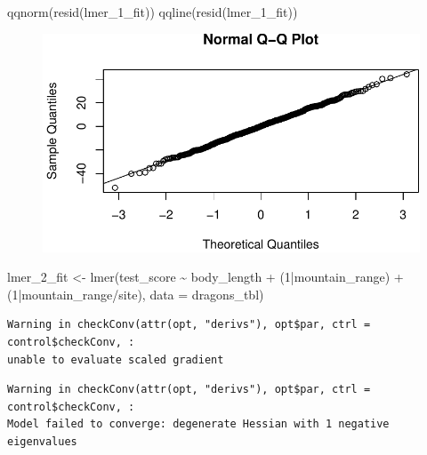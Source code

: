 \documentclass[
  letterpaper,
]{scrbook}
\newenvironment{Shaded}{\begin{snugshade}}{\end{snugshade}}
\newcommand{\AttributeTok}[1]{\textcolor[rgb]{0.40,0.45,0.13}{#1}}
\newcommand{\DecValTok}[1]{\textcolor[rgb]{0.68,0.00,0.00}{#1}}
\newcommand{\FunctionTok}[1]{\textcolor[rgb]{0.28,0.35,0.67}{#1}}
\newcommand{\NormalTok}[1]{\textcolor[rgb]{0.00,0.23,0.31}{#1}}
\newcommand{\OtherTok}[1]{\textcolor[rgb]{0.00,0.23,0.31}{#1}}
\newcommand{\SpecialCharTok}[1]{\textcolor[rgb]{0.37,0.37,0.37}{#1}}
\begin{document}
\begin{Shaded}
\begin{Highlighting}[]
\FunctionTok{qqnorm}\NormalTok{(}\FunctionTok{resid}\NormalTok{(lmer\_1\_fit))}
\FunctionTok{qqline}\NormalTok{(}\FunctionTok{resid}\NormalTok{(lmer\_1\_fit)) }
\end{Highlighting}
\end{Shaded}

\begin{figure}[H]

{\centering \includegraphics{./stat-modeling-mixed_files/figure-pdf/unnamed-chunk-16-1.pdf}

}

\end{figure}

\begin{Shaded}
\begin{Highlighting}[]
\NormalTok{lmer\_2\_fit }\OtherTok{\textless{}{-}} \FunctionTok{lmer}\NormalTok{(test\_score }\SpecialCharTok{\textasciitilde{}}\NormalTok{ body\_length }\SpecialCharTok{+}\NormalTok{ (}\DecValTok{1}\SpecialCharTok{|}\NormalTok{mountain\_range) }\SpecialCharTok{+}\NormalTok{ (}\DecValTok{1}\SpecialCharTok{|}\NormalTok{mountain\_range}\SpecialCharTok{/}\NormalTok{site), }\AttributeTok{data =}\NormalTok{ dragons\_tbl) }
\end{Highlighting}
\end{Shaded}

\begin{verbatim}
Warning in checkConv(attr(opt, "derivs"), opt$par, ctrl = control$checkConv, :
unable to evaluate scaled gradient
\end{verbatim}

\begin{verbatim}
Warning in checkConv(attr(opt, "derivs"), opt$par, ctrl = control$checkConv, :
Model failed to converge: degenerate Hessian with 1 negative eigenvalues
\end{verbatim}
\end{document}
